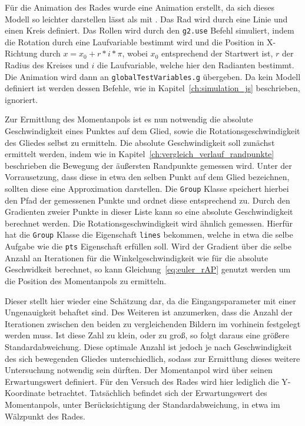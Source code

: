 Für die Animation des Rades wurde eine  Animation erstellt,
da sich dieses Modell so leichter darstellen lässt als mit .
Das Rad wird durch eine Linie und einen Kreis definiert.
Das Rollen wird durch den \lstinline{g2.use} Befehl simuliert, indem die Rotation durch eine Laufvariable bestimmt wird und die Position in X-Richtung durch $x = x_0 + r * i * \pi$, wobei $x_0$ entsprechend der Startwert ist, $r$ der Radius des Kreises und $i$ die Laufvariable, welche hier den Radianten bestimmt.
Die Animation wird dann an \lstinline{globalTestVariables.g} übergeben.
Da kein  Modell definiert ist werden dessen Befehle, wie in Kapitel~\ref{ch:simulation_js} beschrieben, ignoriert.

Zur Ermittlung des Momentanpols ist es nun notwendig die absolute Geschwindigkeit eines Punktes auf dem Glied, sowie die Rotationsgeschwindigkeit des Gliedes selbst zu ermitteln.
Die absolute Geschwindigkeit soll zunächst ermittelt werden, indem wie in Kapitel~\ref{ch:vergleich_verlauf_randpunkte} beschrieben die Bewegung der äußersten Randpunkte gemessen wird.
Unter der Vorrausetzung, dass diese in etwa den selben Punkt auf dem Glied bezeichnen, sollten diese eine Approximation darstellen.
Die \lstinline{Group} Klasse speichert hierbei den Pfad der gemessenen Punkte und ordnet diese entsprechend zu.
Durch den Gradienten zweier Punkte in dieser Liste kann so eine absolute Geschwindigkeit berechnet werden.
Die Rotationsgeschwindigkeit wird ähnlich gemessen.
Hierfür hat die \lstinline{Group} Klasse die Eigenschaft \lstinline{lines} bekommen, welche in etwa die selbe Aufgabe wie die \lstinline{pts} Eigenschaft erfüllen soll.
Wird der Gradient über die selbe Anzahl an Iterationen für die Winkelgeschwindigkeit wie für die absolute Geschwidkeit berechnet, so kann Gleichung~\ref{eq:euler_rAP} genutzt werden um die Position des Momentanpols zu ermitteln.

Dieser stellt hier wieder eine Schätzung dar, da die Eingangsparameter mit einer Ungenauigkeit behaftet sind.
Des Weiteren ist anzumerken, dass die Anzahl der Iterationen zwischen den beiden zu vergleichenden Bildern im vorhinein festgelegt werden muss.
Ist diese Zahl zu klein, oder zu groß, so folgt daraus eine größere Standardabweichung.
Diese optimale Anzahl ist jedoch je nach Geschwindigkeit des sich bewegenden Gliedes unterschiedlich, sodass zur Ermittlung dieses weitere Untersuchung notwendig sein dürften.
Der Momentanpol wird über seinen Erwartungswert definiert.
Für den Versuch des Rades wird hier lediglich die Y-Koordinate betrachtet.
Tatsächlich befindet sich der Erwartungswert des Momentanpols, unter Berücksichtigung der Standardabweichung, in etwa im Wälzpunkt des Rades.

